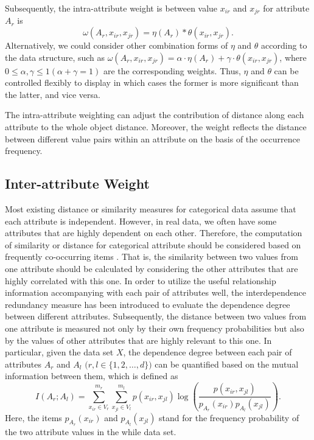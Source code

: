 \documentclass[review]{elsarticle}
\begin{document}
Subsequently, the intra-attribute weight is between value $x_{ir}$ and $x_{jr}$ for attribute $A_r$ is
\begin{equation}
\label{equ9}
\omega(A_r,x_{ir},x_{jr})= \eta(A_r) * \theta(x_{ir},x_{jr}).
\end{equation}
Alternatively, we could consider other combination forms of $\eta$ and $\theta$ according to the data structure, such as $\omega(A_r,x_{ir},x_{jr})= \alpha \cdot \eta(A_r) + \gamma \cdot \theta(x_{ir},x_{jr})$, where $0 \leq \alpha,\gamma \leq 1 (\alpha+\gamma = 1)$ are the corresponding weights. Thus, $\eta$ and $\theta$ can be controlled flexibly to display in which cases the former is more significant than the latter, and vice versa.

The intra-attribute weighting can adjust the contribution of distance along each attribute to the whole object distance. Moreover, the weight reflects the distance between different value pairs within an attribute on the basis of the occurrence frequency.

\subsection{Inter-attribute Weight}
Most existing distance or similarity measures for categorical data assume that each attribute is independent. However, in real data, we often have some attributes that are highly dependent on each other. Therefore, the computation of similarity or distance for categorical attribute should be considered based on frequently co-occurring items \cite{Ganti1999CACTUS}. That is, the similarity between two values from one attribute should be calculated by considering the other attributes that are highly correlated with this one. In order to utilize the useful relationship information accompanying with each pair of attributes well, the interdependence redundancy measure \cite{Au2005Attribute} has been introduced to evaluate the dependence degree between different attributes. Subsequently, the distance between two values from one attribute is measured not only by their own frequency probabilities but also by the values of other attributes that are highly relevant to this one. In particular, given the data set $X$, the dependence degree between each pair of attributes $A_r$ and $A_l$ $\mathbf (r,l \in \{1,2,\dots,d\})$ can be quantified based on the mutual information \cite{MacKay2003Information} between them, which is defined as
\begin{equation}
I(A_r;A_l) = \sum_{x_{ir} \in V_r}^{m_r}\sum_{x_{jl} \in V_l}^{m_l}p(x_{ir},x_{jl})\log(\frac{p(x_{ir},x_{jl})}{p_{A_r}(x_{ir})p_{A_l}(x_{jl})}).
\label{equ10}
\end{equation}
Here, the items $p_{A_r}(x_{ir})$ and $p_{A_l}(x_{jl})$ stand for the frequency probability of the two attribute values in the while data set.
\end{document}
